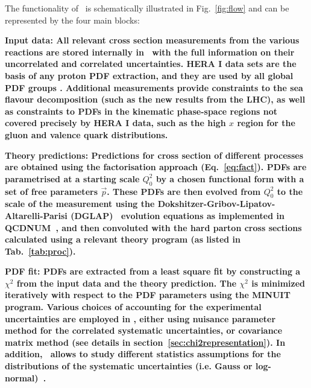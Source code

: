 %
\normalsize
The functionality of \fitter~is schematically illustrated in Fig.~\ref{fig:flow} and can be represented by the four main blocks: %

\begin{description}
\item 
\bf {Input data:} \rm  All relevant cross section measurements from the various reactions
are stored internally in \fitter\ with the full information on their uncorrelated and correlated
uncertainties. HERA I data sets are the basis of any proton PDF extraction, and they are used by all global PDF groups \cite{MSTWpdf, CT10pdf, NNPDFpdf, ABMpdf, JRpdf}. Additional measurements provide constraints to the sea flavour decomposition (such as the new results from the LHC), as well as constraints to PDFs in the kinematic phase-space regions not covered precisely by HERA I data, such as the high $x$ region for the gluon and valence quark distributions.
\item
\bf{Theory predictions:} \rm  Predictions for cross section of different processes are obtained using the factorisation approach (Eq.~\ref{eq:fact}). PDFs are parametrised at a starting scale $Q_0^2$  by a chosen functional form with a set of free parameters $\vec{p}$. These PDFs are then evolved from $Q_0^2$ to the scale of the measurement using the 
Dokshitzer-Gribov-Lipatov-Altarelli-Parisi 
(DGLAP)~\cite{Gribov:1972ri, Gribov:1972rt, Lipatov:1974qm,
Dokshitzer:1977sg, Altarelli:1977zs} evolution equations 
as implemented in QCDNUM~\cite{qcdnum}, 
and then convoluted with the hard parton cross sections calculated
using a relevant theory program (as listed in Tab.~\ref{tab:proc}).
\item
\bf{PDF fit:} \rm  PDFs are extracted from a least square fit by constructing a 
$\chi^2$ from the input data and the theory prediction.
The $\chi^2$ is  minimized iteratively 
with respect to the PDF parameters using the MINUIT\cite{minuit} program.
Various choices of accounting for the experimental uncertainties are employed in \fitter, 
either using nuisance parameter method for the correlated systematic uncertainties, 
or covariance matrix method (see details in section~\ref{sec:chi2representation}). In addition, \fitter~allows to study different statistics 
assumptions for the distributions of the systematic uncertainties (i.e. Gauss or log-normal)~\cite{hera-lhc:report2009}.

\end{description}
